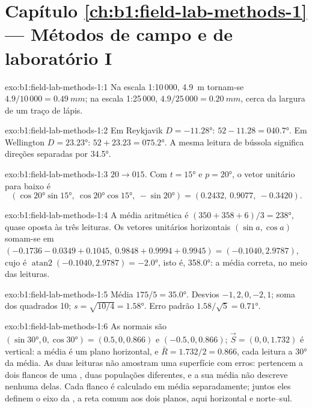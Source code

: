\section*{Capítulo \ref{ch:b1:field-lab-methods-1} --- Métodos de campo e de laboratório I}

\begin{solution}{exo:b1:field-lab-methods-1:1}
Na escala 1:10\,000, \qty{4.9}{m} tornam-se $4.9/10\,000 = \qty{0.49}{mm}$; na
escala 1:25\,000, $4.9/25\,000 = \qty{0.20}{mm}$, cerca da largura de um traço de lápis.
\end{solution}

\begin{solution}{exo:b1:field-lab-methods-1:2}
Em Reykjavik $D = \ang{-11.28}$: $52 - 11.28 = \ang{040.7}$. Em Wellington
$D = \ang{+23.23}$: $52 + 23.23 = \ang{075.2}$. A mesma leitura de bússola significa
direções separadas por \ang{34.5}.
\end{solution}

\begin{solution}{exo:b1:field-lab-methods-1:3}
$20\to015$. Com $t = \ang{15}$ e $p = \ang{20}$, o vetor unitário para baixo é
\[
  (\cos\ang{20}\sin\ang{15},\ \cos\ang{20}\cos\ang{15},\ -\sin\ang{20}) =
  (0.2432,\ 0.9077,\ -0.3420).
\]
\end{solution}

\begin{solution}{exo:b1:field-lab-methods-1:4}
A média aritmética é $(350 + 358 + 6)/3 = \ang{238}$, quase oposta às três
leituras. Os vetores unitários horizontais $(\sin a, \cos a)$ somam-se em
$(-0.1736 - 0.0349 + 0.1045,\ 0.9848 + 0.9994 + 0.9945) = (-0.1040, 2.9787)$,
cujo  é $\operatorname{atan2}(-0.1040, 2.9787) = \ang{-2.0}$, isto é,
\ang{358.0}: a média correta, no meio das leituras.
\end{solution}

\begin{solution}{exo:b1:field-lab-methods-1:5}
Média $175/5 = \ang{35.0}$. Desvios $-1, 2, 0, -2, 1$; soma dos quadrados 10;
$s = \sqrt{10/4} = \ang{1.58}$. Erro padrão $1.58/\sqrt5 = \ang{0.71}$.
\end{solution}

\begin{solution}{exo:b1:field-lab-methods-1:6}
As normais são $(\sin\ang{30}, 0, \cos\ang{30}) = (0.5, 0, 0.866)$ e
$(-0.5, 0, 0.866)$; $\vec S = (0, 0, 1.732)$ é vertical: a média é um plano horizontal, e $\bar R = 1.732/2 = 0.866$, cada leitura a \ang{30} da média. As duas leituras não amostram uma superfície com erros: pertencem a dois flancos de uma , duas populações diferentes, e a sua média não descreve nenhuma delas. Cada flanco é calculado em média separadamente; juntos eles definem o eixo da , a reta comum aos dois planos, aqui horizontal e norte--sul.
\end{solution}

